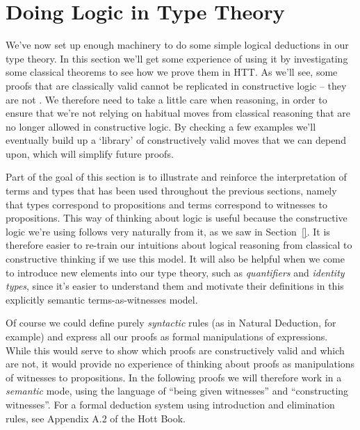 \section{Doing Logic in Type Theory}
\label{sec:DoingLogic}

We've now set up enough machinery to do some simple logical deductions in our type theory.  In this section we'll get some experience of using it by investigating some classical theorems to see how we prove them in HTT.  As we'll see, some proofs that are classically valid cannot be replicated in constructive logic -- they are not .  We therefore need to take a little care when reasoning, in order to ensure that we're not relying on habitual moves from classical reasoning that are no longer allowed in constructive logic.  By checking a few examples we'll eventually build up a `library' of constructively valid moves that we can depend upon, which will simplify future proofs.  

Part of the goal of this section is to illustrate and reinforce the interpretation of terms and types that has been used throughout the previous sections, namely that types correspond to propositions and terms correspond to witnesses to propositions.  This way of thinking about logic is useful because the constructive logic we're using follows very naturally from it, as we saw in Section~\ref{}.  It is therefore easier to re-train our intuitions about logical reasoning from classical to constructive thinking if we use this model.  It will also be helpful when we come to introduce new elements into our type theory, such as \emph{quantifiers} and \emph{identity types}, since it's easier to understand them and motivate their definitions in this explicitly semantic terms-as-witnesses model.

Of course we could define purely \emph{syntactic} rules (as in Natural Deduction, for example) and express all our proofs as formal manipulations of expressions.  While this would serve to show which proofs are constructively valid and which are not, it would provide no experience of thinking about proofs as manipulations of witnesses to propositions.  In the following proofs we will therefore work in a \emph{semantic} mode, using the language of ``being given witnesses'' and ``constructing witnesses''.  For a formal deduction system using introduction and elimination rules, see Appendix A.2 of the Hott Book.

